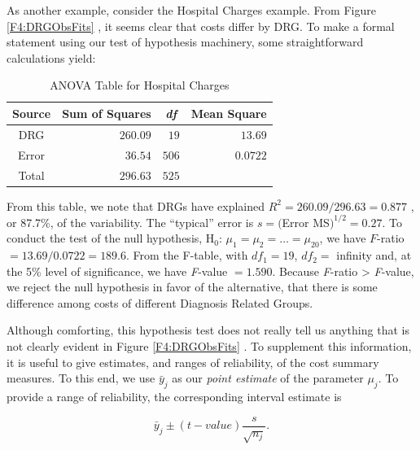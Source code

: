 As another example, consider the Hospital Charges example. From
Figure \ref{F4:DRGObsFits} , it seems clear that costs differ by
DRG. To make a formal statement using our test of hypothesis
machinery, some straightforward calculations yield:

  \begin{center}  \begin{table}[h]
\caption{\label{T4:HospChgANOVA} ANOVA Table for Hospital Charges}
\begin{tabular}{cccc}
\hline
Source & Sum of Squares & \textit{df} & Mean Square \\ \hline
DRG & \multicolumn{1}{r}{$260.09$} & \multicolumn{1}{r}{$19$} &
\multicolumn{1}{r}{$13.69$} \\
Error & \multicolumn{1}{r}{$36.54$} & \multicolumn{1}{r}{$506$} &
\multicolumn{1}{r}{$0.0722$} \\
Total & \multicolumn{1}{r}{$296.63$} & \multicolumn{1}{r}{$525$} &
\multicolumn{1}{r}{} \\ \hline
\end{tabular}

\end{table}  \end{center}  

\noindent From this table, we note that DRGs have explained $R^{2}=260.09/296.63=0.877$%
, or 87.7\%, of the variability. The ``typical'' error is $s=($Error MS$%
)^{1/2}=0.27$. To conduct the test of the null hypothesis, H$_0$:
$\mu _1=\mu_2=\ldots =\mu_{20}$, we have $F$-ratio
$=13.69/0.0722=189.6$. From the F-table, with $df_1=19$, $df_2=$
infinity and, at the 5\% level of significance, we have
\textit{F}-value $=1.590$. Because \textit{F}-ratio
> \textit{F}-value, we reject the null hypothesis in favor of
the alternative, that there is some difference among costs of different
Diagnosis Related Groups.

Although comforting, this hypothesis test does not really tell us
anything that is not clearly evident in Figure \ref{F4:DRGObsFits} .
To supplement this information, it is useful to give estimates, and
ranges of reliability, of the cost summary measures. To this end, we
use $\bar{y}_{j}$ as our \textit{point estimate} of the parameter
$\mu_{j}$. To provide a range of reliability, the corresponding
interval estimate is

\begin{equation*}
\bar{y}_{j}\pm (t-value)\frac{s}{\sqrt{n_{j}}}.
\end{equation*}

